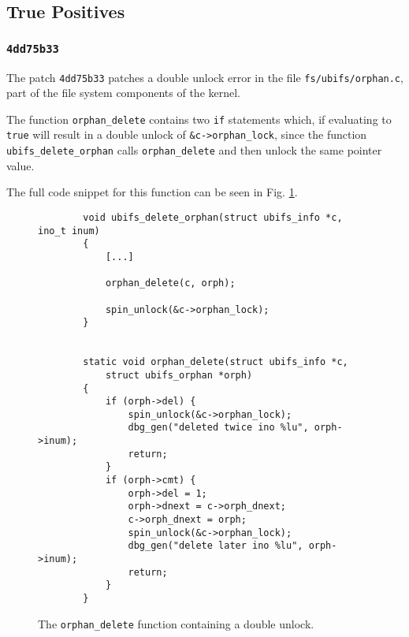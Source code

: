 \subsection{True Positives}

\subsubsection{\texttt{4dd75b33}}

\newpar The patch \texttt{4dd75b33} patches a double unlock error in the file \texttt{fs/ubifs/orphan.c}, part of the file system components of the kernel.

\newpar The function \texttt{orphan\_delete} contains two \texttt{if} statements which, if evaluating to \texttt{true} will result in a double unlock of \texttt{\&c->orphan\_lock}, since the function \texttt{ubifs\_delete\_orphan} calls \texttt{orphan\_delete} and then unlock the same pointer value. 

\newpar The full code snippet for this function can be seen in Fig. \ref{fig:orphan.c}.

\begin{figure}[H]
    \centering
    \begin{verbatim}
        void ubifs_delete_orphan(struct ubifs_info *c, ino_t inum)
        {
            [...]
            
            orphan_delete(c, orph);

            spin_unlock(&c->orphan_lock);
        }


        static void orphan_delete(struct ubifs_info *c, 
            struct ubifs_orphan *orph)
        {
            if (orph->del) {
                spin_unlock(&c->orphan_lock);
                dbg_gen("deleted twice ino %lu", orph->inum);
                return;
            }
            if (orph->cmt) {
                orph->del = 1;
                orph->dnext = c->orph_dnext;
                c->orph_dnext = orph;
                spin_unlock(&c->orphan_lock);
                dbg_gen("delete later ino %lu", orph->inum);
                return;
            }
        }
    \end{verbatim}
    \caption{The \texttt{orphan\_delete} function containing a double unlock.}
    \label{fig:orphan.c}
\end{figure}